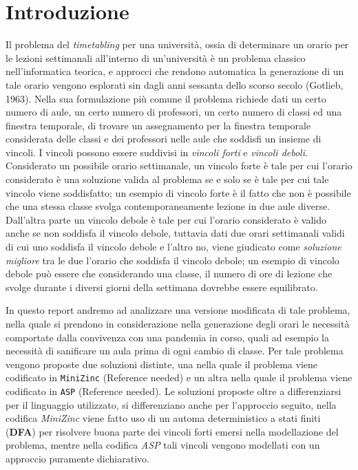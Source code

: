 \documentclass[12pt,english, openany]{book}
\begin{document}
\chapter{Introduzione}
Il problema del \textit{timetabling} per una università, ossia di determinare un orario per le lezioni settimanali all'interno di un'università è un problema classico nell'informatica teorica, e approcci che rendono automatica la generazione di un tale orario vengono esplorati sin dagli anni sessanta dello scorso secolo (Gotlieb, 1963). Nella sua formulazione più comune il problema richiede dati un certo numero di aule, un certo numero di professori, un certo numero di classi ed una finestra temporale, di trovare un assegnamento per la finestra temporale considerata delle classi e dei professori nelle aule che soddisfi un insieme di vincoli. I vincoli possono essere suddivisi in \textit{vincoli forti} e \textit{vincoli deboli}.
Considerato un possibile orario settimanale, un vincolo forte è tale per cui l'orario considerato è una soluzione valida al problema se e solo se è tale per cui tale vincolo viene soddisfatto; un esempio di vincolo forte è il fatto che non è possibile che una stessa classe svolga contemporaneamente lezione in due aule diverse.
Dall'altra parte un vincolo debole è tale per cui l'orario considerato è valido anche se non soddisfa il vincolo debole, tuttavia dati due orari settimanali validi di cui uno soddisfa il vincolo debole e l'altro no, viene giudicato come \textit{soluzione migliore} tra le due l'orario che soddisfa il vincolo debole; un esempio di vincolo debole può essere che considerando una classe, il numero di ore di lezione che svolge durante i diversi giorni della settimana dovrebbe essere equilibrato.

In questo report andremo ad analizzare una versione modificata di tale problema, nella quale si prendono in considerazione nella generazione degli orari le necessità comportate dalla convivenza con una pandemia in corso, quali ad esempio la necessità di sanificare un aula prima di ogni cambio di classe. Per tale problema vengono proposte due soluzioni distinte, una nella quale il problema viene codificato in \texttt{MiniZinc} (Reference needed) e un altra nella quale il problema viene codificato in \texttt{ASP} (Reference needed). Le soluzioni proposte oltre a differenziarsi per il linguaggio utilizzato, si differenziano anche per l'approccio seguito, nella codifica \textit{MiniZinc} viene fatto uso di un automa deterministico a stati finiti (\textbf{DFA}) per risolvere buona parte dei vincoli forti emersi nella modellazione del problema, mentre nella codifica \textit{ASP} tali vincoli vengono modellati con un approccio puramente dichiarativo.
\end{document}
